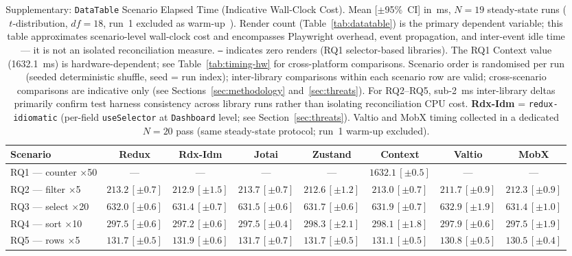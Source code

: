 \documentclass[conference]{IEEEtran}
\newcommand{\code}[1]{\texttt{\small #1}}
\begin{document}
\begin{table}[tb]
\caption{Supplementary: \code{DataTable} Scenario Elapsed Time
  (Indicative Wall-Clock Cost).
  Mean [$\pm$95\%~CI] in~ms, $N{=}19$ steady-state runs
  ($t$-distribution, $df{=}18$, run~1 excluded as warm-up~\cite{b10}).
  Render count (Table~\ref{tab:datatable}) is the primary dependent
  variable; this table approximates scenario-level wall-clock cost and
  encompasses Playwright overhead, event propagation, and inter-event
  idle time --- it is not an isolated reconciliation measure.
  \texttt{---} indicates zero renders (RQ1 selector-based libraries).
  The RQ1 Context value (1632.1~ms) is hardware-dependent; see
  Table~\ref{tab:timing-hw} for cross-platform comparisons.
  Scenario order is randomised per run (seeded deterministic shuffle,
  seed = run index); inter-library comparisons within each scenario
  row are valid; cross-scenario comparisons are indicative only
  (see Sections~\ref{sec:methodology} and~\ref{sec:threats}).
  For RQ2--RQ5, sub-2~ms inter-library deltas primarily confirm
  test harness consistency across library runs rather than isolating
  reconciliation CPU cost.
  \textbf{Rdx-Idm} = \code{redux-idiomatic} (per-field
  \code{useSelector} at \code{Dashboard} level; see
  Section~\ref{sec:threats}).
  Valtio and MobX timing collected in a dedicated $N{=}20$ pass
  (same steady-state protocol; run~1 warm-up excluded).}
\label{tab:timing}
\begin{center}
\small
\setlength{\tabcolsep}{3pt}
\begin{tabular}{lccccccc}
\toprule
\textbf{Scenario}
  & \textbf{Redux}
  & \textbf{Rdx-Idm}
  & \textbf{Jotai}
  & \textbf{Zustand}
  & \textbf{Context}
  & \textbf{Valtio}
  & \textbf{MobX} \\
\midrule
RQ1 --- counter $\times$50
  & ---
  & ---
  & ---
  & ---
  & $1632.1\,[\pm 0.5]$
  & ---
  & --- \\
RQ2 --- filter $\times$5
  & $213.2\,[\pm 0.7]$
  & $212.9\,[\pm 1.5]$
  & $213.7\,[\pm 0.7]$
  & $212.6\,[\pm 1.2]$
  & $213.0\,[\pm 0.7]$
  & $211.7\,[\pm 0.9]$
  & $212.3\,[\pm 0.9]$ \\
RQ3 --- select $\times$20
  & $632.0\,[\pm 0.6]$
  & $631.4\,[\pm 0.7]$
  & $631.5\,[\pm 0.6]$
  & $631.7\,[\pm 0.6]$
  & $631.9\,[\pm 0.7]$
  & $632.9\,[\pm 1.9]$
  & $631.4\,[\pm 1.0]$ \\
RQ4 --- sort $\times$10
  & $297.5\,[\pm 0.6]$
  & $297.2\,[\pm 0.6]$
  & $297.5\,[\pm 0.4]$
  & $298.3\,[\pm 2.1]$
  & $298.1\,[\pm 1.8]$
  & $297.9\,[\pm 0.6]$
  & $297.5\,[\pm 1.9]$ \\
RQ5 --- rows $\times$5
  & $131.7\,[\pm 0.5]$
  & $131.9\,[\pm 0.6]$
  & $131.7\,[\pm 0.7]$
  & $131.7\,[\pm 0.5]$
  & $131.1\,[\pm 0.5]$
  & $130.8\,[\pm 0.5]$
  & $130.5\,[\pm 0.4]$ \\
\bottomrule
\end{tabular}
\end{center}
\end{table}
\end{document}
